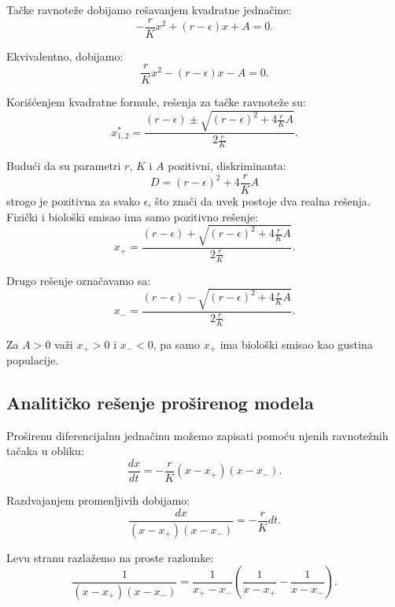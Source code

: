 \documentclass[12pt]{article}
\begin{document}
Tačke ravnoteže dobijamo rešavanjem kvadratne jednačine:
\begin{equation}
-\frac{r}{K}x^2 + (r - \epsilon)x + A = 0.
\end{equation}

Ekvivalentno, dobijamo:
\begin{equation}
\frac{r}{K}x^2 - (r - \epsilon)x - A = 0.
\end{equation}

Korišćenjem kvadratne formule, rešenja za tačke ravnoteže su:
\begin{equation}
x_{1,2}^* = \frac{(r - \epsilon) \pm \sqrt{(r - \epsilon)^2 + 4\frac{r}{K}A}}{2\frac{r}{K}}.
\end{equation}

Budući da su parametri $r$, $K$ i $A$ pozitivni, diskriminanta:
\begin{equation}
D = (r - \epsilon)^2 + 4\frac{r}{K}A
\end{equation}
strogo je pozitivna za svako $\epsilon$, što znači da uvek postoje dva realna rešenja. Fizički i biološki smisao ima samo pozitivno rešenje:
\begin{equation}
x_+ = \frac{(r - \epsilon) + \sqrt{(r - \epsilon)^2 + 4\frac{r}{K}A}}{2\frac{r}{K}}.
\end{equation}

Drugo rešenje označavamo sa:
\begin{equation}
x_- = \frac{(r - \epsilon) - \sqrt{(r - \epsilon)^2 + 4\frac{r}{K}A}}{2\frac{r}{K}}.
\end{equation}

Za $A>0$ važi $x_+>0$ i $x_-<0$, pa samo $x_+$ ima biološki smisao kao gustina populacije.

\subsection{Analitičko rešenje proširenog modela}

Proširenu diferencijalnu jednačinu možemo zapisati pomoću njenih ravnotežnih tačaka u obliku:
\begin{equation}
\frac{dx}{dt} = -\frac{r}{K}(x-x_+)(x-x_-).
\end{equation}

Razdvajanjem promenljivih dobijamo:
\begin{equation}
\frac{dx}{(x-x_+)(x-x_-)} = -\frac{r}{K}dt.
\end{equation}

Levu stranu razlažemo na proste razlomke:
\begin{equation}
\frac{1}{(x-x_+)(x-x_-)} = \frac{1}{x_+-x_-}\left(\frac{1}{x-x_+} - \frac{1}{x-x_-}\right).
\end{equation}
\end{document}
